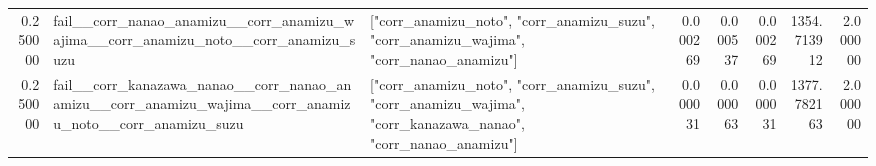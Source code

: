 \begin{tabular}{rllrrrrr}
0.250000 & fail\_\_corr\_nanao\_anamizu\_\_corr\_anamizu\_wajima\_\_corr\_anamizu\_noto\_\_corr\_anamizu\_suzu & ["corr\_anamizu\_noto", "corr\_anamizu\_suzu", "corr\_anamizu\_wajima", "corr\_nanao\_anamizu"] & 0.000269 & 0.000537 & 0.000269 & 1354.713912 & 2.000000 \\
0.250000 & fail\_\_corr\_kanazawa\_nanao\_\_corr\_nanao\_anamizu\_\_corr\_anamizu\_wajima\_\_corr\_anamizu\_noto\_\_corr\_anamizu\_suzu & ["corr\_anamizu\_noto", "corr\_anamizu\_suzu", "corr\_anamizu\_wajima", "corr\_kanazawa\_nanao", "corr\_nanao\_anamizu"] & 0.000031 & 0.000063 & 0.000031 & 1377.782163 & 2.000000 \\
\bottomrule
\end{tabular}
